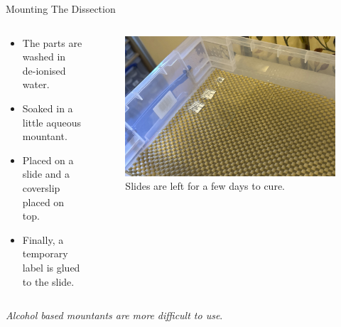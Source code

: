 \documentclass[
  ignorenonframetext,
]{beamer}
\providecommand{\tightlist}{%
  \setlength{\itemsep}{0pt}\setlength{\parskip}{0pt}}
\begin{document}
\begin{frame}{Mounting The Dissection}
\protect\hypertarget{mounting-the-dissection}{}
\begin{columns}[T]
\begin{column}{0.5\textwidth}
\begin{itemize}
\tightlist
\item
  The parts are washed in de-ionised water.
\item
  Soaked in a little aqueous mountant.
\item
  Placed on a slide and a coverslip placed on top.
\item
  Finally, a temporary label is glued to the slide.
\end{itemize}
\end{column}

\begin{column}{0.5\textwidth}
\begin{figure}
\centering
\includegraphics{./images/mounted_slides.jpg}
\caption{Slides are left for a few days to cure.}
\end{figure}
\end{column}
\end{columns}

\emph{Alcohol based mountants are more difficult to use}.
\end{frame}
\end{document}
